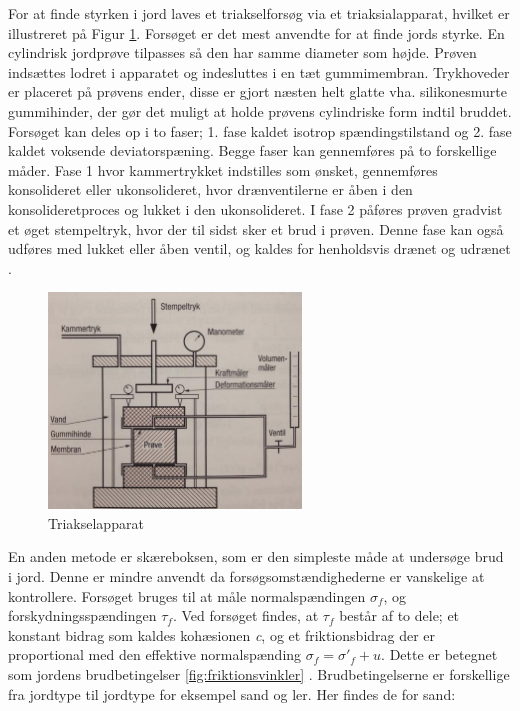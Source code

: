For at finde styrken i jord laves et triakselforsøg via et triaksialapparat, hvilket er illustreret på Figur \ref{fig:forskudningsspanding}. Forsøget er det mest anvendte for at finde jords styrke. En cylindrisk jordprøve tilpasses så den har samme diameter som højde. Prøven indsættes lodret i apparatet og indesluttes i en tæt gummimembran. Trykhoveder er placeret på prøvens ender, disse er gjort næsten helt glatte vha. silikonesmurte gummihinder, der gør det muligt at holde prøvens cylindriske form indtil bruddet.  
\newline \indent{     } Forsøget kan deles op i to faser; 1. fase kaldet isotrop spændingstilstand og 2. fase kaldet voksende deviatorspæning. Begge faser kan gennemføres på to forskellige måder. Fase 1 hvor kammertrykket indstilles som ønsket, gennemføres konsolideret eller ukonsolideret, hvor drænventilerne er åben i den konsolideretproces og lukket i den ukonsolideret. I fase 2 påføres prøven gradvist et øget stempeltryk, hvor der til sidst sker et brud i prøven. Denne fase kan også udføres med lukket eller åben ventil, og kaldes for henholdsvis drænet og udrænet \citep{geoteknik}.

\begin{figure}[htbp]
	\centering
	\includegraphics[width=0.6\textwidth]{billeder/forskud.png}
	\caption{Triakselapparat \citep{geoteknik}}
	\label{fig:forskudningsspanding}
\end{figure}

En anden metode er skæreboksen, som er den simpleste måde at undersøge brud i jord. Denne er mindre anvendt da forsøgsomstændighederne er vanskelige at kontrollere. Forsøget bruges til at måle normalspændingen $\sigma_f$, og forskydningsspændingen $\tau_f$. Ved forsøget findes, at $\tau_f$ består af to dele; et konstant bidrag som kaldes kohæsionen \textit{c}, og et friktionsbidrag der er proportional med den effektive normalspænding $\sigma_f = \sigma'_f + u$. Dette er betegnet som jordens brudbetingelser \ref{fig:friktionsvinkler} \citep{geoteknik}. 
\newline \indent{     }  Brudbetingelserne er forskellige fra jordtype til jordtype for eksempel sand og ler. Her findes de for sand: 


